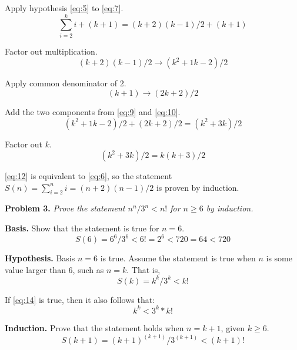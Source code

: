 \documentclass[12pt]{article}
\begin{document}
Apply hypothesis \eqref{eq:5} to \eqref{eq:7}.
\begin{equation}
    \sum_{i=2}^k i + (k+1) = (k+2)(k-1)/2 + (k+1)
\end{equation}

Factor out multiplication.
\begin{equation}
    (k+2)(k-1)/2 \to (k^2+1k-2)/2
    \label{eq:9}
\end{equation}

Apply common denominator of 2.
\begin{equation}
    (k+1) \to (2k+2)/2
    \label{eq:10}
\end{equation}

Add the two components from \eqref{eq:9} and \eqref{eq:10}.
\begin{equation}
    (k^2+1k-2)/2 + (2k+2)/2 = (k^2+3k)/2
\end{equation}

Factor out $k$.
\begin{equation}
    (k^2+3k)/2 = k(k+3)/2
    \label{eq:12}
\end{equation}

\eqref{eq:12} is equivalent to \eqref{eq:6}, so the statement $S(n) =
    \sum_{i=2}^n i = (n+2)(n-1)/2$ is proven by induction.

\newpage
\textbf{Problem 3. }\textit{Prove the statement $n^n/3^n < n!$ for $n \geq 6$ by
    induction.}

\textbf{Basis. } Show that the statement is true for $n=6$.
\begin{equation}
    S(6) = 6^6/3^6 < 6! = 2^6 < 720 = 64 < 720
\end{equation}

\textbf{Hypothesis. } Basis $n=6$ is true. Assume the statement is true when $n$
is some value larger than 6, such as $n=k$. That is, \newline
\begin{equation}
    S(k) = k^k/3^k < k!
    \label{eq:14}
\end{equation}

If \eqref{eq:14} is true, then it also follows that:
\begin{equation}
    k^k < 3^k*k!
    \label{eq:15}
\end{equation}

\textbf{Induction. } Prove that the statement holds when $n=k+1$, given $k \geq
    6$.
\begin{equation}
    S(k+1) = (k+1)^{(k+1)}/3^{(k+1)} < (k+1)!
\end{equation}
\end{document}
